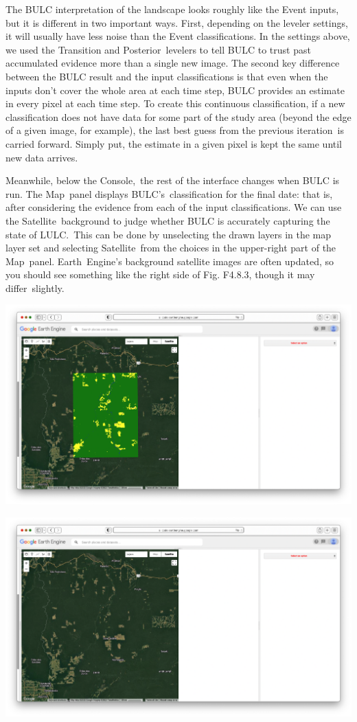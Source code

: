 \documentclass[
  letterpaper,
  DIV=11,
  numbers=noendperiod]{scrreprt}
\begin{document}
The BULC interpretation of the landscape looks roughly like the Event
inputs, but it is different in two important ways. First, depending on
the leveler settings, it will usually have less noise than the Event
classifications. In the settings above, we used the Transition and
Posterior~levelers to tell BULC to trust past accumulated evidence more
than a single new image. The second key difference between the BULC
result and the input classifications is that even when the inputs don't
cover the whole area at each time step, BULC provides an estimate in
every pixel at each time step. To create this continuous classification,
if a new classification does not have data for some part of the study
area (beyond the edge of a given image, for example), the last best
guess from the previous iteration~is carried forward. Simply put, the
estimate in a given pixel is kept the same until new data arrives.

Meanwhile, below the Console,~the rest of the interface changes when
BULC is run. The Map~panel displays BULC's~classification for the final
date: that is, after considering the evidence from each of the input
classifications. We can use the Satellite~background to judge whether
BULC is accurately capturing the state of LULC.~This can be done by
unselecting the drawn layers in the map layer set and selecting
Satellite~from the choices in the upper-right part of the Map~panel.
Earth~Engine's background satellite images are often updated, so you
should see something like the right side of Fig. F4.8.3, though it may
differ~slightly.~

\includegraphics{./F4/image57.png}

\includegraphics{./F4/image65.png}
\end{document}
